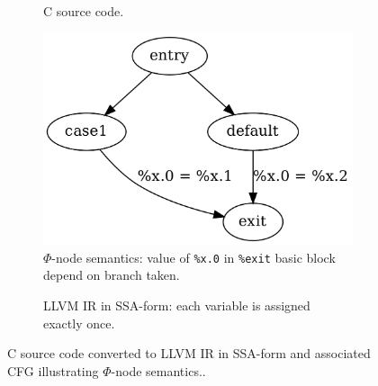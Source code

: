 \begin{figure}[htbp]
	\centering
	\begin{subfigure}[ht]{0.18\textwidth}
		\centering
		
		\caption{C source code.}
		\label{fig:c_source_phi}
	\end{subfigure}
	\qquad
	\begin{subfigure}[ht]{0.25\textwidth}
		\centering
		\includegraphics[width=\textwidth]{inc/phi.png}
		\caption{$\Phi$-node semantics: value of \texttt{\%x.0} in \texttt{\%exit} basic block depend on branch taken.}
		\label{fig:phi_node_semantics}
	\end{subfigure}
	\begin{subfigure}[ht]{0.50\textwidth}
		
		\caption{LLVM IR in SSA-form: each variable is assigned exactly once.}
		\label{fig:ssa_form}
	\end{subfigure}
	\caption{C source code converted to LLVM IR in SSA-form and associated CFG illustrating $\Phi$-node semantics..}
\end{figure}

